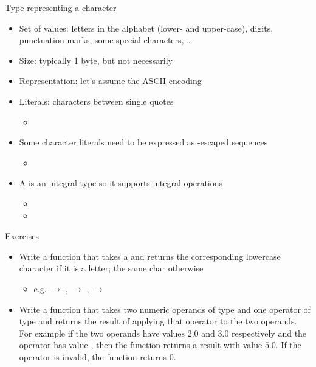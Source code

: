 \begin{frame}[fragile]{}

  Type representing a character

  \begin{itemize}[<+->]
  \item Set of values: letters in the alphabet (lower- and upper-case), digits,
    punctuation marks, some special characters, \ldots
  \item Size: typically 1 byte, but not necessarily
  \item Representation: let's assume the
    \href{https://en.wikipedia.org/wiki/ASCII}{ASCII} encoding
  \item Literals: characters between single quotes
    \begin{itemize}[<.->]
    \item {}
    \end{itemize}
  \item Some character literals need to be expressed as \code{\bslash}-escaped
    sequences
    \begin{itemize}[<.->]
    \item {}
    \end{itemize}
  \item A  is an integral type so it supports integral operations
    \begin{itemize}
    \item {}
    \item {}
    \end{itemize}
  \end{itemize}

\end{frame}

\begin{frame}{Exercises}

  \begin{itemize}
  \item Write a function that takes a  and returns the corresponding
    lowercase character if it is a letter; the same char otherwise
    \begin{itemize}
    \item e.g.  $\rightarrow$ ,  $\rightarrow$
      , \upquote{;} $\rightarrow$ \upquote{;}
    \end{itemize}
  \item Write a function that takes two numeric operands of type 
    and one operator of type  and returns the result of applying that
    operator to the two operands. For example if the two operands have values
    $2.0$ and $3.0$ respectively and the operator has value \code{\upquote{+}},
    then the function returns a result with value $5.0$. If the operator is
    invalid, the function returns $0$.
  \end{itemize}
\end{frame}
